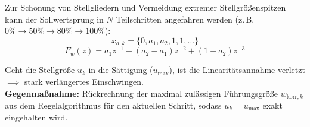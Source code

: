 \begin{tcolorbox}
Zur Schonung von Stellgliedern und Vermeidung extremer Stellgrößenspitzen kann der Sollwertsprung in $N$ Teilschritten angefahren werden (z.\,B. $0\% \to 50\% \to 80\% \to 100\%$):
\[
x_{a,k} = \{0, a_1, a_2, 1, 1, \dots\}
\]
\[
F_w(z) = a_1 z^{-1} + (a_2 - a_1) z^{-2} + (1 - a_2) z^{-3}
\]
\end{tcolorbox}

\begin{tcolorbox}
Geht die Stellgröße $u_k$ in die Sättigung ($u_{\max}$), ist die Linearitätsannahme verletzt $\implies$ stark verlängertes Einschwingen.\\[2pt]
\textbf{Gegenmaßnahme:} Rückrechnung der maximal zulässigen Führungsgröße $w_{\text{korr},k}$ aus dem Regelalgorithmus für den aktuellen Schritt, sodass $u_k = u_{\max}$ exakt eingehalten wird.
\end{tcolorbox}
